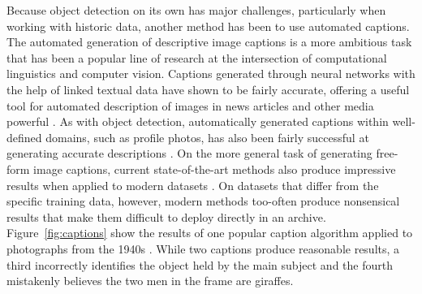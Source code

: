 \documentclass[10pt, a4paper]{article}
\begin{document}
Because object detection on its own has major challenges, particularly when
working with historic data, another method has been to use automated captions.
The automated generation of descriptive image captions is a more ambitious task
that has been a popular line of research at the intersection of computational
linguistics and computer vision. Captions generated through neural networks
with the help of linked
textual data have shown to be fairly accurate, offering a useful tool for
automated description of images in news articles and other media  powerful
\cite{hessel-etal-2019-unsupervised} \cite{BATRA18.725} \cite{HOLLINK16.19}.
As with object detection, automatically generated
captions within well-defined domains, such as profile photos, has also been
fairly successful at generating accurate descriptions \cite{GATT18.226}.
On the more general task of generating free-form image captions, current
state-of-the-art methods also produce impressive results when applied to
modern datasets \cite{nikolaus-etal-2019-compositional} \cite{jiang-etal-2019-reo}
\cite{wang-etal-2018-object}. On datasets that differ from the specific training data,
however, modern methods too-often produce nonsensical results that make them
difficult to deploy directly in an archive. Figure~\ref{fig:captions}
show the results of one popular caption algorithm applied to photographs from
the 1940s \cite{xu2015show}. While two captions produce reasonable results, a
third incorrectly identifies the object held by the main subject and the fourth
mistakenly believes the two men in the frame are giraffes.
\end{document}
